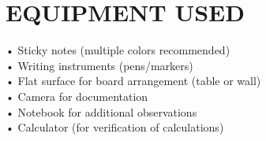   \newpage
\chapter{EQUIPMENT USED}
• Sticky notes (multiple colors recommended)\\
• Writing instruments (pens/markers)\\
• Flat surface for board arrangement (table or wall)\\
• Camera for documentation\\
• Notebook for additional observations\\
• Calculator (for verification of calculations)



